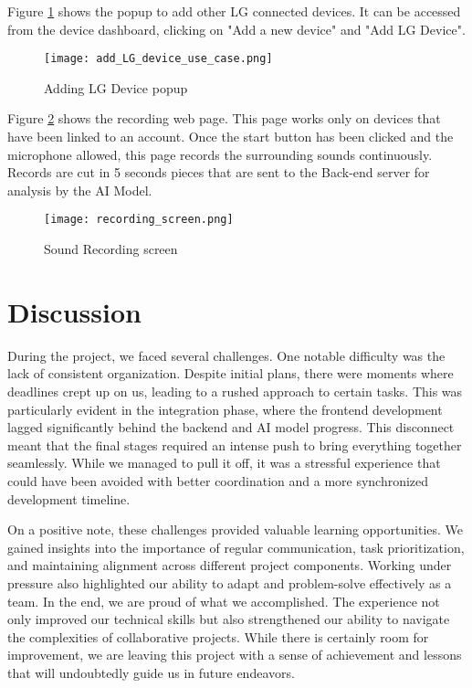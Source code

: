 \documentclass[conference]{IEEEtran}
\begin{document}
Figure \ref{fig:lg_devices} shows the popup to add other LG connected devices. It can be accessed from the device dashboard, clicking on "Add a new device" and "Add LG Device".

\begin{figure}[H]
    \centering
    \texttt{[image: add\_LG\_device\_use\_case.png]}
    \caption{Adding LG Device popup}
    \label{fig:lg_devices}
\end{figure}

Figure \ref{fig:recording} shows the recording web page. This page works only on devices that have been linked to an account. Once the start button has been clicked and the microphone allowed, this page records the surrounding sounds continuously. Records are cut in 5 seconds pieces that are sent to the Back-end server for analysis by the AI Model.

\begin{figure}[H]
    \centering
    \texttt{[image: recording\_screen.png]}
    \caption{Sound Recording screen}
    \label{fig:recording}
\end{figure}


\section{Discussion}
During the project, we faced several challenges. One notable difficulty was the lack of consistent organization. Despite initial plans, there were moments where deadlines crept up on us, leading to a rushed approach to certain tasks. This was particularly evident in the integration phase, where the frontend development lagged significantly behind the backend and AI model progress. This disconnect meant that the final stages required an intense push to bring everything together seamlessly. While we managed to pull it off, it was a stressful experience that could have been avoided with better coordination and a more synchronized development timeline.
\newline 

On a positive note, these challenges provided valuable learning opportunities. We gained insights into the importance of regular communication, task prioritization, and maintaining alignment across different project components. Working under pressure also highlighted our ability to adapt and problem-solve effectively as a team. In the end, we are proud of what we accomplished. The experience not only improved our technical skills but also strengthened our ability to navigate the complexities of collaborative projects. While there is certainly room for improvement, we are leaving this project with a sense of achievement and lessons that will undoubtedly guide us in future endeavors.
\end{document}

